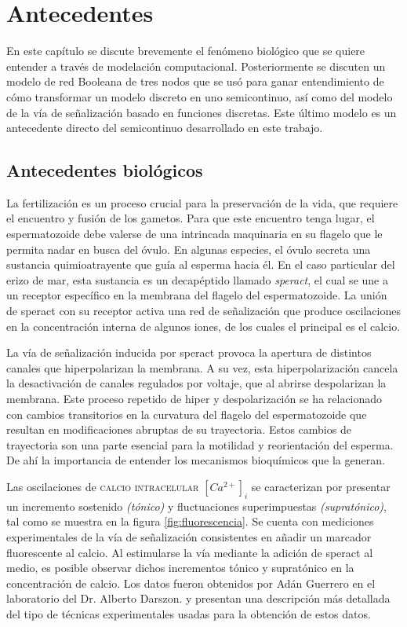 \chapter{Antecedentes}\label{ch:antecedentes}

En este capítulo se discute brevemente el fenómeno biológico que se quiere entender a través de modelación computacional. Posteriormente se discuten un modelo de red Booleana de tres nodos que se usó para ganar entendimiento de cómo transformar un modelo discreto en uno semicontinuo, así como del modelo de la vía de señalización basado en funciones discretas. Este último modelo es un antecedente directo del semicontinuo desarrollado en este trabajo.

\section{Antecedentes biol\'ogicos}

La fertilización es un proceso crucial para la preservación de la vida, que requiere el encuentro y fusión de los gametos. Para que este encuentro tenga lugar, el espermatozoide debe valerse de una intrincada maquinaria en su flagelo que le permita nadar en busca del óvulo. En algunas especies, el óvulo secreta una sustancia quimioatrayente que guía al esperma hacia él. En el caso particular del erizo de mar, esta sustancia es un decapéptido llamado \emph{speract}, el cual se une a un receptor específico en la membrana del flagelo del espermatozoide. La unión de speract con su receptor activa una red de señalización que produce oscilaciones en la concentración interna de algunos iones, de los cuales el principal es el calcio. 

La vía de señalización inducida por speract provoca la apertura de distintos canales que hiperpolarizan la membrana. A su vez, esta hiperpolarización cancela la desactivación de canales regulados por voltaje, que al abrirse despolarizan la membrana. Este proceso repetido de hiper y despolarización se ha relacionado con cambios transitorios en la curvatura del flagelo del espermatozoide que resultan en modificaciones abruptas de su trayectoria. Estos cambios de trayectoria son una parte esencial para la motilidad y reorientación del esperma. De ahí la importancia de entender los mecanismos bioquímicos que la generan. 

Las oscilaciones de \textsc{calcio intracelular} $[Ca^{2+}]_i$ se caracterizan por presentar un incremento sostenido \emph{(tónico)} y fluctuaciones superimpuestas \emph{(supratónico)}, tal como se muestra en la figura \ref{fig:fluorescencia}. Se cuenta con mediciones experimentales de la vía de señalización consistentes en añadir un marcador fluorescente al calcio. Al estimularse la vía mediante la adición de speract al medio, es posible observar dichos incrementos tónico y supratónico en la concentración de calcio. Los datos fueron obtenidos por Adán Guerrero en el laboratorio del Dr. Alberto Darszon. \citeauthor{Darszon2008} \citep{Darszon2008} y \citeauthor{Wood2007} \citep{Wood2007} presentan una descripción más detallada del tipo de técnicas experimentales usadas para la obtención de estos datos.


